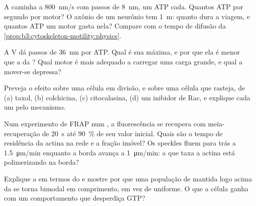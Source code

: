 \begin{exercise}[$\star\star$]\label{exo:b3:cytoskeleton-motility:6}
A  caminha a \qty{800}{nm/s} com passos de \qty{8}{nm}, um ATP
cada. Quantos ATP por segundo por motor? O axônio de um neurônio tem
\qty{1}{m}: quanto dura a viagem, e quantos ATP um motor gasta nela?
Compare com o tempo de difusão da
\cref{prop:b3:cytoskeleton-motility:physics}.
\end{exercise}

\begin{exercise}[$\star\star$]\label{exo:b3:cytoskeleton-motility:7}
A  V dá passos de \qty{36}{nm} por ATP. Qual é sua  máxima, e por que ela é menor que a da ? Qual motor é
mais adequado a carregar uma carga grande, e qual a mover-se depressa?
\end{exercise}

\begin{exercise}[$\star\star$]\label{exo:b3:cytoskeleton-motility:8}
Preveja o efeito sobre uma célula em divisão, e sobre uma célula que
rasteja, de (a) taxol, (b) colchicina, (c) citocalasina, (d) um
inibidor de Rac, e explique cada um pelo mecanismo.
\end{exercise}

\begin{exercise}[$\star\star$]\label{exo:b3:cytoskeleton-motility:9}
Num experimento de FRAP num , a fluorescência se recupera
com meia-recuperação de \qty{20}{s} até \qty{90}{\%} de seu valor
inicial. Quais são o tempo de residência da actina na rede e a fração
imóvel? Os speckles fluem para trás a \qty{1.5}{\micro m/min} enquanto
a borda avança a \qty{1}{\micro m/min}: a que taxa a actina está
polimerizando na borda?
\end{exercise}

\begin{exercise}[$\star\star\star$]\label{exo:b3:cytoskeleton-motility:10}
Explique a  em termos do  e mostre
por que uma população de  mantida logo acima da
 se torna bimodal em comprimento, em vez de
uniforme. O que a célula ganha com um comportamento que desperdiça GTP?
\end{exercise}

